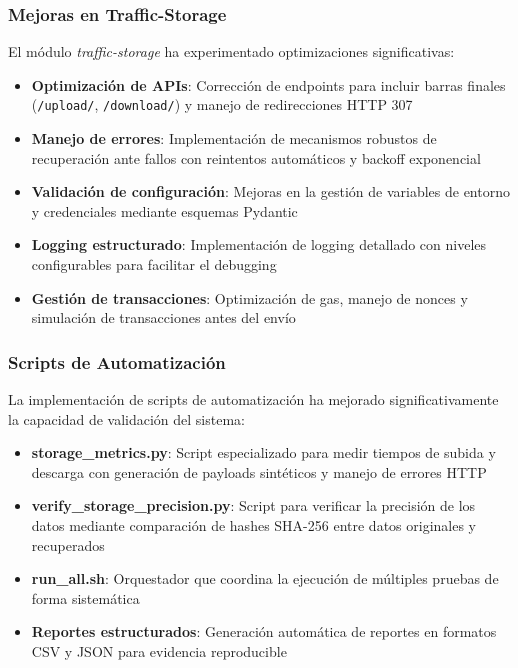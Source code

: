 \documentclass[onecolumn]{article}
\begin{document}
\subsubsection{Mejoras en Traffic-Storage}

El módulo \textit{traffic-storage} ha experimentado optimizaciones significativas:

\begin{itemize}
    \item \textbf{Optimización de APIs}: Corrección de endpoints para incluir barras finales (\texttt{/upload/}, \texttt{/download/}) y manejo de redirecciones HTTP 307
    \item \textbf{Manejo de errores}: Implementación de mecanismos robustos de recuperación ante fallos con reintentos automáticos y backoff exponencial
    \item \textbf{Validación de configuración}: Mejoras en la gestión de variables de entorno y credenciales mediante esquemas Pydantic
    \item \textbf{Logging estructurado}: Implementación de logging detallado con niveles configurables para facilitar el debugging
    \item \textbf{Gestión de transacciones}: Optimización de gas, manejo de nonces y simulación de transacciones antes del envío
\end{itemize}

\subsubsection{Scripts de Automatización}

La implementación de scripts de automatización ha mejorado significativamente la capacidad de validación del sistema:

\begin{itemize}
    \item \textbf{storage\_metrics.py}: Script especializado para medir tiempos de subida y descarga con generación de payloads sintéticos y manejo de errores HTTP
    \item \textbf{verify\_storage\_precision.py}: Script para verificar la precisión de los datos mediante comparación de hashes SHA-256 entre datos originales y recuperados
    \item \textbf{run\_all.sh}: Orquestador que coordina la ejecución de múltiples pruebas de forma sistemática
    \item \textbf{Reportes estructurados}: Generación automática de reportes en formatos CSV y JSON para evidencia reproducible
\end{itemize}
\end{document}
